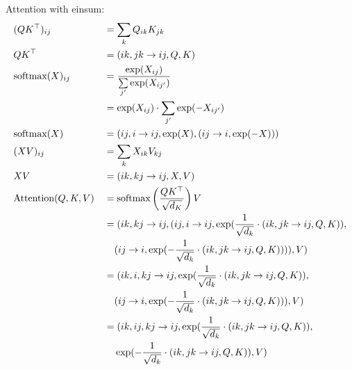 Attention with einsum:
\begin{align*}
     & (QK^\T)_{ij}              &  & = \sum\limits_{k} Q_{ik} K_{jk}                                                                                  \\
     & QK^\T                     &  & = (ik, jk \rightarrow ij, Q, K)                                                                                  \\
     & \text{softmax}(X)_{ij}    &  & = \frac{\exp(X_{ij})}{\sum\limits_{j'} \exp(X_{ij'})}                                                            \\
     &                           &  & = \exp(X_{ij}) \cdot \sum\limits_{j'} \exp(-X_{ij'})                                                             \\
     & \text{softmax}(X)         &  & = (ij, i \rightarrow ij, \exp(X), (ij \rightarrow i, \exp(-X)))                                                  \\
     & (XV)_{ij}                 &  & = \sum\limits_{k} X_{ik} V_{kj}                                                                                  \\
     & XV                        &  & = (ik, kj \rightarrow ij, X, V)                                                                                  \\
     & \text{Attention}(Q, K, V) &  & = \text{softmax}\left(\frac{Q K^\T}{\sqrt{d_K}}\right)V                                                          \\
     &                           &  & = (ik, kj \rightarrow ij, (ij, i \rightarrow ij, \exp(\frac{1}{\sqrt{d_k}} \cdot (ik, jk \rightarrow ij, Q, K)), \\
     &                           &  & \phantom{{}=} (ij \rightarrow i, \exp(-\frac{1}{\sqrt{d_k}} \cdot (ik, jk \rightarrow ij, Q, K)))), V)           \\
     &                           &  & = (ik, i, kj \rightarrow ij, \exp(\frac{1}{\sqrt{d_k}} \cdot (ik, jk \rightarrow ij, Q, K)),                     \\
     &                           &  & \phantom{{}= } (ij \rightarrow i, \exp(-\frac{1}{\sqrt{d_k}} \cdot (ik, jk \rightarrow ij, Q, K))), V)           \\
     &                           &  & = (ik, ij, kj \rightarrow ij, \exp(\frac{1}{\sqrt{d_k}} \cdot (ik, jk \rightarrow ij, Q, K)),                    \\
     &                           &  & \phantom{{}=}\exp(-\frac{1}{\sqrt{d_k}} \cdot (ik, jk \rightarrow ij, Q, K)), V)
\end{align*}

\blindtext[1]